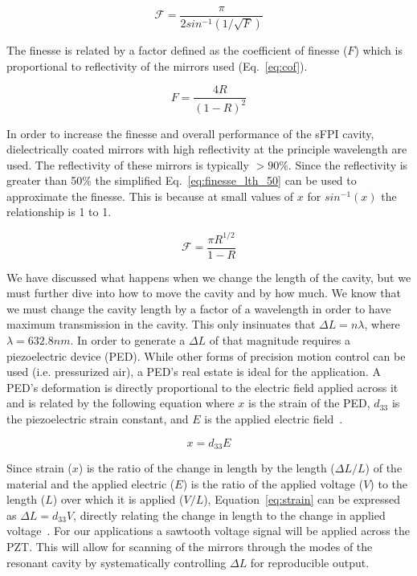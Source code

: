 \documentclass[12pt,journal]{IEEEtran}
\begin{document}
\begin{equation}
\mathcal{F} = \frac{\pi}{2sin^{-1}(1/\sqrt{F})}
\label{eq:finesse}
\end{equation}

The finesse is related by a factor defined as the coefficient of finesse ($F$) which is proportional to reflectivity of the mirrors used (Eq.~\ref{eq:cof}).

\begin{equation}
F = \frac{4R}{(1-R)^2}
\label{eq:cof}
\end{equation}  

In order to increase the finesse and overall performance of the sFPI cavity, dielectrically coated mirrors with high reflectivity at the principle wavelength are used. The reflectivity of these mirrors is typically $>90\%$. Since the reflectivity is greater than 50\% the simplified Eq.~\ref{eq:finesse_lth_50} can be used to approximate the finesse. This is because at small values of $x$ for $sin^{-1}(x)$ the relationship is 1 to 1. 

\begin{equation}
\mathcal{F} = \frac{\pi R^{1/2}}{1-R}
\label{eq:finesse_lth_50}
\end{equation}   

We have discussed what happens when we change the length of the cavity, but we must further dive into how to move the cavity and by how much. We know that we must change the cavity length by a factor of a wavelength in order to have maximum transmission in the cavity. This only insinuates that $\Delta L = n\lambda$, where $\lambda = 632.8 nm$. In order to generate a $\Delta L$ of that magnitude requires a piezoelectric device (PED). While other forms of precision motion control can be used (i.e. pressurized air), a PED's real estate is ideal for the application. A PED's deformation is directly proportional to the electric field applied across it and is related by the following equation where $x$ is the strain of the PED, $d_{33}$ is the piezoelectric strain constant, and $E$ is the applied electric field~\cite{piezo}. 

\begin{equation}
x = d_{33}E
\label{eq:strain}
\end{equation}   

Since strain ($x$) is the ratio of the change in length by the length ($\Delta L/L$) of the material and the applied electric ($E$) is the ratio of the applied voltage ($V$) to the length ($L$) over which it is applied ($V/L$), Equation~\ref{eq:strain} can be expressed as $\Delta L = d_{33}V$, directly relating the change in length to the change in applied voltage~\cite{piezo}. For our applications a sawtooth voltage signal will be applied across the PZT. This will allow for scanning of the mirrors through the modes of the resonant cavity by systematically controlling $\Delta L$ for reproducible output. 
\end{document}
